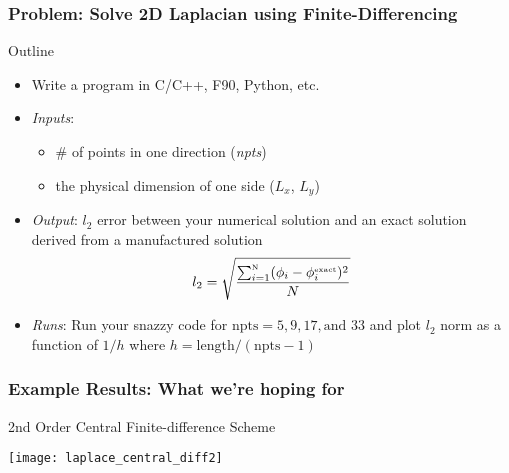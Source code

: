 \documentclass[mathserif]{beamer}
\begin{document}

 \begin{frame}
   \frametitle{Problem: Solve 2D Laplacian using Finite-Differencing}

   \begin{block}{Outline}
     \begin{itemize} 
     \item Write a program in C/C++, F90, Python, etc. 
     \item {\em Inputs}: 
       \begin{itemize}
	 \item \# of points in one direction ({\em npts})
	 \item the physical dimension of one side ($L_x$, $L_y$)
       \end{itemize}
     \item {\em Output}: $l_2$ error between your numerical solution
       and an exact solution derived from a manufactured solution
       \begin{equation}
         \nonumber
         l_2 = \sqrt{ \frac{\sum_{i=1}^{\text{\tiny N}} (\phi_i-\phi_i^{\text{\tiny exact}})^2}N}
       \end{equation}
     \item {\em Runs}: Run your snazzy code for $\text{npts} =
       5,9,17,\text{and } 33$ and plot $l_2$ norm as a function of $1/h$ where
       $h=\text{length}/(\text{npts}-1)$
       
     \end{itemize}    
   \end{block}

 \end{frame}

\begin{frame}
  \frametitle{Example Results: What we're hoping for}
  2nd Order Central Finite-difference Scheme

 \begin{center}
  \texttt{[image: laplace\_central\_diff2]}
 \end{center}
  
\end{frame}
\end{document}
